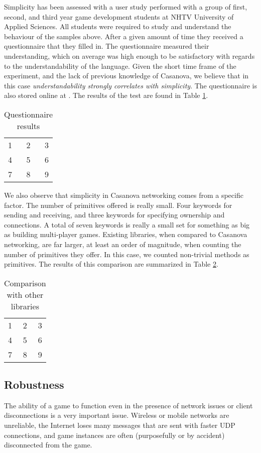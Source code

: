 Simplicity has been assessed with a user study performed with a group of first, second, and third year game development students at NHTV University of Applied Sciences. All students were required to study and understand the behaviour of the samples above. After a given amount of time they received a questionnaire that they filled in. The questionnaire measured their understanding, which on average was high enough to be satisfactory with regards to the understandability of the language. Given the short time frame of the experiment, and the lack of previous knowledge of Casanova, we believe that in this case \textit{understandability strongly correlates with simplicity}. The questionnaire is also stored online at \cite{CNV_MULTIPLAYER_USERSTUDY_QUESTIONNAIRE}. The results of the test are found in Table \ref{tab:user study}.

\begin{table}
\center
\begin{tabular}{ l c r }
  1 & 2 & 3 \\
  4 & 5 & 6 \\
  7 & 8 & 9 \\
\end{tabular}
\label{tab:user study}
\caption{Questionnaire results}
\end{table}

We also observe that simplicity in Casanova networking comes from a specific factor. The number of primitives offered is really small. Four keywords for sending and receiving, and three keywords for specifying ownership and connections. A total of seven keywords is really a small set for something as big as building multi-player games. Existing libraries, when compared to Casanova networking, are far larger, at least an order of magnitude, when counting the number of primitives they offer. In this case, we counted non-trivial methods as primitives. The results of this comparison are summarized in Table \ref{tab:networking libraries}.

\begin{table}
\center
\begin{tabular}{ l c r }
  1 & 2 & 3 \\
  4 & 5 & 6 \\
  7 & 8 & 9 \\
\end{tabular}
\label{tab:networking libraries}
\caption{Comparison with other libraries}
\end{table}

\subsection{Robustness}
The ability of a game to function even in the presence of network issues or client disconnections is a very important issue. Wireless or mobile networks are unreliable, the Internet loses many messages that are sent with faster UDP connections, and game instances are often (purposefully or by accident) disconnected from the game.

